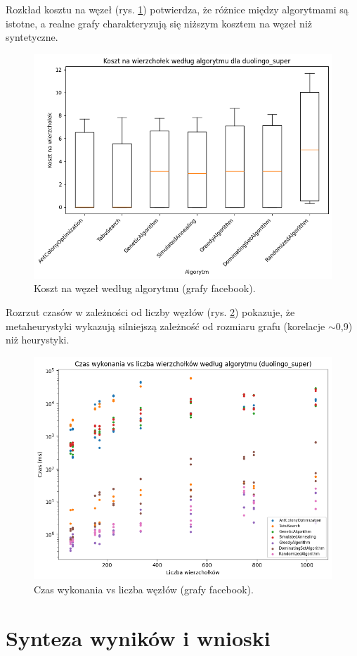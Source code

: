 Rozkład kosztu na węzeł (rys. \ref{fig:facebook_cost_per_node}) potwierdza, że różnice między algorytmami są istotne, a realne grafy charakteryzują się niższym kosztem na węzeł niż syntetyczne.

\begin{figure}[H]
  \centering
  \includegraphics[width=0.7\linewidth]{assets/figures/facebook_cost_per_node.png}
  \caption{Koszt na węzeł według algorytmu (grafy facebook).}
  \label{fig:facebook_cost_per_node}
\end{figure}

Rozrzut czasów w zależności od liczby węzłów (rys. \ref{fig:facebook_time_scatter}) pokazuje, że metaheurystyki wykazują silniejszą zależność od rozmiaru grafu (korelacje $\sim$0,9) niż heurystyki.

\begin{figure}[H]
  \centering
  \includegraphics[width=0.7\linewidth]{assets/figures/facebook_time_scatter.png}
  \caption{Czas wykonania vs liczba węzłów (grafy facebook).}
  \label{fig:facebook_time_scatter}
\end{figure}

\section{Synteza wyników i wnioski}

